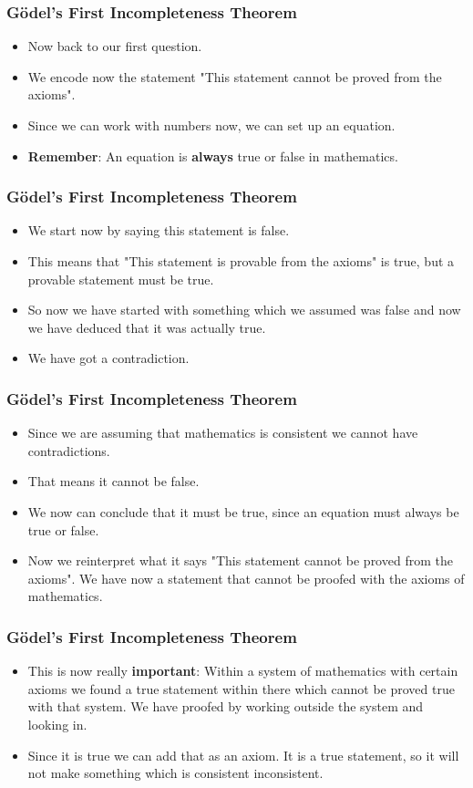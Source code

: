 \documentclass[aspectratio=169]{beamer}
\begin{document}
\begin{frame}
	\frametitle{Gödel's First Incompleteness Theorem}
	\begin{itemize}
		\item Now back to our first question.
		\item We encode now the statement "This statement cannot be proved from the axioms".
		\item Since we can work with numbers now, we can set up an equation.
		\item \textbf{Remember}: An equation is \textbf{always} true or false in mathematics.
	\end{itemize}
\end{frame}

\begin{frame}
	\frametitle{Gödel's First Incompleteness Theorem}
	\begin{itemize}
		\item We start now by saying this statement is false. 
		\item This means that "This statement is provable from the axioms" is true, but a provable statement must be true.
		\item So now we have started with something which we assumed was false and now we have deduced that it was actually true. 
		\item We have got a contradiction.
	\end{itemize}
\end{frame}

\begin{frame}
	\frametitle{Gödel's First Incompleteness Theorem}
	\begin{itemize}
		\item Since we are assuming that mathematics is consistent we cannot have contradictions.
		\item That means it cannot be false. 
		\item We now can conclude that it must be true, since an equation must always be true or false.
		\item Now we reinterpret what it says "This statement cannot be proved from the axioms". We have now a statement that cannot be proofed with the axioms of mathematics.
	\end{itemize}
\end{frame}

\begin{frame}
	\frametitle{Gödel's First Incompleteness Theorem}
	\begin{itemize}
		\item This is now really \textbf{important}: Within a system of mathematics with certain axioms we found a true statement within there which cannot be proved true with that system. We have proofed by working outside the system and looking in. \label{important}
		\item Since it is true we can add that as an axiom. It is a true statement, so it will not make something which is consistent inconsistent.
	\end{itemize}
\end{frame}
\end{document}

